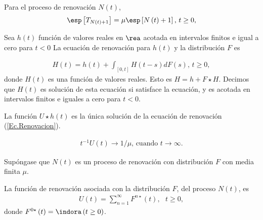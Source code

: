 \begin{Coro}
Para el proceso de renovaci\'on $N\left(t\right)$,
\begin{eqnarray*}
\esp\left[T_{N\left(t\right)+1}\right]=\mu\esp\left[N\left(t\right)+1\right]\textrm{,  }t\geq0,
\end{eqnarray*}  
\end{Coro}


\begin{Def}
Sea $h\left(t\right)$ funci\'on de valores reales en $\rea$ acotada en intervalos finitos e igual a cero para $t<0$ La ecuaci\'on de renovaci\'on para $h\left(t\right)$ y la distribuci\'on $F$ es

\begin{eqnarray}\label{Ec.Renovacion}
H\left(t\right)=h\left(t\right)+\int_{\left[0,t\right]}H\left(t-s\right)dF\left(s\right)\textrm{,    }t\geq0,
\end{eqnarray}
donde $H\left(t\right)$ es una funci\'on de valores reales. Esto es $H=h+F\star H$. Decimos que $H\left(t\right)$ es soluci\'on de esta ecuaci\'on si satisface la ecuaci\'on, y es acotada en intervalos finitos e iguales a cero para $t<0$.
\end{Def}

\begin{Prop}
La funci\'on $U\star h\left(t\right)$ es la \'unica soluci\'on de la ecuaci\'on de renovaci\'on (\ref{Ec.Renovacion}).
\end{Prop}

\begin{Teo}
\begin{eqnarray*}
t^{-1}U\left(t\right)\rightarrow 1/\mu\textrm{,    cuando }t\rightarrow\infty.
\end{eqnarray*}
\end{Teo}



Sup\'ongase que $N\left(t\right)$ es un proceso de renovaci\'on con distribuci\'on $F$ con media finita $\mu$.

\begin{Def}
La funci\'on de renovaci\'on asociada con la distribuci\'on $F$, del proceso $N\left(t\right)$, es
\begin{eqnarray*}
U\left(t\right)=\sum_{n=1}^{\infty}F^{n\star}\left(t\right),\textrm{   }t\geq0,
\end{eqnarray*}
donde $F^{0\star}\left(t\right)=\indora\left(t\geq0\right)$.
\end{Def}


